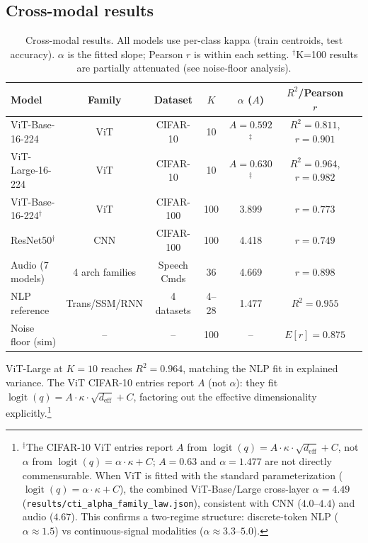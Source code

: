 \documentclass{article}
\DeclareMathOperator{\logit}{logit}
\begin{document}
\subsection{Cross-modal results}
\begin{table}[t]
\centering
\caption{Cross-modal results. All models use per-class kappa (train centroids, test accuracy). $\alpha$ is the fitted slope; Pearson $r$ is within each setting. $^\dagger$K=100 results are partially attenuated (see noise-floor analysis).}
\label{tab:vit}
\small
\begin{tabular}{lcccccc}
\toprule
Model & Family & Dataset & $K$ & $\alpha$ ($A$) & $R^2$/Pearson $r$ \\
\midrule
ViT-Base-16-224     & ViT  & CIFAR-10  & 10  & $A{=}0.592$$^\ddagger$ & $R^2=0.811$, $r=0.901$ \\
ViT-Large-16-224    & ViT  & CIFAR-10  & 10  & $A{=}0.630$$^\ddagger$ & $R^2=0.964$, $r=0.982$ \\
ViT-Base-16-224$^\dagger$  & ViT  & CIFAR-100 & 100 & 3.899 & $r=0.773$ \\
ResNet50$^\dagger$           & CNN  & CIFAR-100 & 100 & 4.418 & $r=0.749$ \\
Audio (7 models)    & 4 arch families & Speech Cmds & 36 & 4.669 & $r=0.898$ \\
\midrule
NLP reference       & Trans/SSM/RNN & 4 datasets & 4--28 & 1.477 & $R^2=0.955$ \\
Noise floor (sim)   & -- & -- & 100 & -- & $E[r]=0.875$ \\
\bottomrule
\end{tabular}
\end{table}

ViT-Large at $K=10$ reaches $R^2=0.964$, matching the NLP fit in explained variance. The ViT CIFAR-10 entries report $A$ (not $\alpha$): they fit $\logit(q)=A\cdot\kappa\cdot\sqrt{d_\mathrm{eff}}+C$, factoring out the effective dimensionality explicitly.\footnote{$^\ddagger$The CIFAR-10 ViT entries report $A$ from $\logit(q)=A\cdot\kappa\cdot\sqrt{d_\mathrm{eff}}+C$, not $\alpha$ from $\logit(q)=\alpha\cdot\kappa+C$; $A{=}0.63$ and $\alpha{=}1.477$ are not directly commensurable. When ViT is fitted with the standard parameterization ($\logit(q)=\alpha\cdot\kappa+C$), the combined ViT-Base/Large cross-layer $\alpha{=}4.49$ (\texttt{results/cti\_alpha\_family\_law.json}), consistent with CNN ($4.0$--$4.4$) and audio ($4.67$). This confirms a two-regime structure: discrete-token NLP ($\alpha{\approx}1.5$) vs continuous-signal modalities ($\alpha{\approx}3.3$--$5.0$).}
\end{document}
